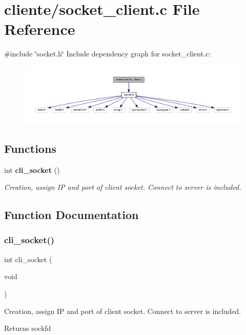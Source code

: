 \section{cliente/socket\+\_\+client.c File Reference}
\label{socket__client_8c}
{\ttfamily \#include \char`\"{}socket.\+h\char`\"{}}\newline
Include dependency graph for socket\+\_\+client.\+c\+:\nopagebreak
\begin{figure}[H]
\begin{center}
\leavevmode
\includegraphics[width=350pt]{socket__client_8c__incl}
\end{center}
\end{figure}
\subsection*{Functions}
\begin{DoxyCompactItemize}
\item 
int \textbf{ cli\+\_\+socket} ()
\begin{DoxyCompactList}\small\item\em Creation, assign IP and port of client socket. Connect to server is included. \end{DoxyCompactList}\end{DoxyCompactItemize}


\subsection{Function Documentation}
\mbox{\label{socket__client_8c_a9c129efbce40f3061d7899d2adf36a55}} 
\subsubsection{cli\+\_\+socket()}
{\footnotesize\ttfamily int cli\+\_\+socket (\begin{DoxyParamCaption}\item[{void}]{ }\end{DoxyParamCaption})}



Creation, assign IP and port of client socket. Connect to server is included. 

\begin{DoxyReturn}{Returns}
sockfd 
\end{DoxyReturn}
